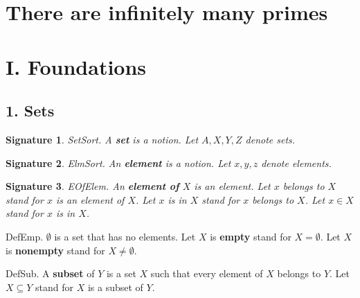 \newtheorem{signature}{Signature} 
\newtheorem{axiom}{Axiom} 
\newcommand{\power}{{\cal P}} 
\newcommand{\preimg}[2]{{#1}^{-1}[#2]} 
\newcommand{\Seq}[2]{\{#1,\dots,#2\}}
\newcommand{\Set}[3]{\{#1_{#2},\dots,#1_{#3}\}}
\newcommand{\Product}[3]{\prod_{i=#2}^{#3}{#1}_i}
\newcommand{\subfunc}[2]{{#1}_{#2}}
\newcommand{\CC}{{\Bbb C}}
\newcommand{\RR}{{\Bbb R}}
\newcommand{\QQ}{{\Bbb Q}}
\newcommand{\ZZ}{{\Bbb Z}} 
\newcommand{\NN}{{\Bbb N}}


\section{There are infinitely many primes}
\section{I. Foundations}


\subsection{1. Sets}


\begin{signature} SetSort.  A {\bf set} is a notion.
Let $A,X,Y,Z$ denote sets.
\end{signature}

\begin{signature} ElmSort.  
An {\bf element} is a notion.
Let $x,y,z$ denote elements.
\end{signature}

\begin{signature} EOfElem.  
An {\bf element of} $X$ is an element.
Let $x$ belongs to $X$ stand for $x$ is an element of $X$.
Let $x$ is in $X$ stand for $x$ belongs to $X$.
Let $x \in X$ stand for $x$ is in $X$.
\end{signature}

\begin{definition} DefEmp.
$\emptyset$ is a set that has no elements.
Let $X$ is {\bf empty} stand for $X = \emptyset$.
Let $X$ is {\bf nonempty} stand for $X \neq \emptyset$.
\end{definition}

\begin{definition} DefSub.  
A {\bf subset} of $Y$ is a set $X$ such that
every element of $X$ belongs to $Y$.
Let $X \subseteq Y$ stand for $X$ is a subset of $Y$.
\end{definition}

